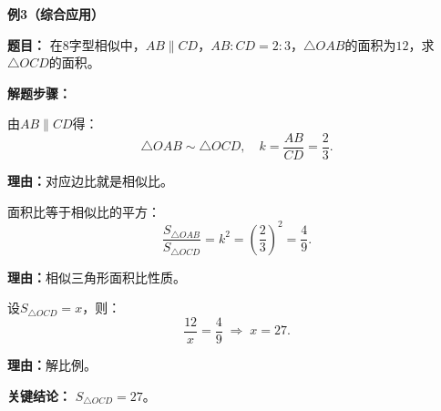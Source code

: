 \begin{examplebox}
	\medskip
	\textbf{\textcolor{CExample}{例3（综合应用）}}
	\par\textbf{\textcolor{CExample}{题目：}} 在8字型相似中，$AB\parallel CD$，$AB:CD=2:3$，$\triangle OAB$的面积为$12$，求$\triangle OCD$的面积。
	\par\textbf{\textcolor{CExample}{解题步骤：}}
	\begin{description}[style=nextline, leftmargin=2.8em, labelsep=0.5em, itemsep=0.45em]
		\item[\textbf{第一步（求相似比）：}]
			由$AB\parallel CD$得：
			\[
				\triangle OAB\sim\triangle OCD,\quad k=\frac{AB}{CD}=\frac{2}{3}.
			\]
			\par\textbf{理由：}对应边比就是相似比。
		\item[\textbf{第二步（面积比转化）：}]
			面积比等于相似比的平方：
			\[
				\frac{S_{\triangle OAB}}{S_{\triangle OCD}}=k^2=\left(\frac{2}{3}\right)^2=\frac{4}{9}.
			\]
			\par\textbf{理由：}相似三角形面积比性质。
		\item[\textbf{第三步（代值求解）：}]
			设$S_{\triangle OCD}=x$，则：
			\[
				\frac{12}{x}=\frac{4}{9}\;\Rightarrow\; x=27.
			\]
			\par\textbf{理由：}解比例。
	\end{description}
	\par\textbf{\textcolor{CExample}{关键结论：}} \textbf{$S_{\triangle OCD}=27$}。
\end{examplebox}
